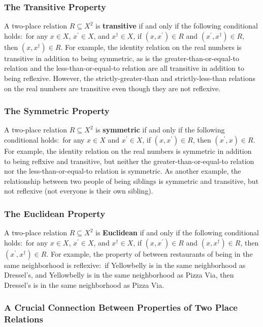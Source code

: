 \documentclass[11pt]{article}
\theoremstyle{definition}
\theoremstyle{remark}
\begin{document}
\subsubsection{The Transitive Property}
A two-place relation $R\subseteq X^{2}$ is \textbf{transitive} if and only if the following conditional holds:\ for any $x\in X$, $x^{\prime}\in X$, and $x^{\dagger}\in X$, if $(x,x^{\prime})\in R$ and  $(x^{\prime},x^{\dagger})\in R$, then $(x,x^{\dagger})\in R$. For example, the identity relation on the real numbers is transitive in addition to being symmetric, as is the greater-than-or-equal-to relation and the less-than-or-equal-to relation are all transitive in addition to being reflexive. However, the strictly-greater-than and strictly-less-than relations on the real numbers are transitive even though they are not reflexive.

\subsubsection{The Symmetric Property}
A two-place relation $R\subseteq X^{2}$ is \textbf{symmetric} if and only if the following conditional holds:\ for any $x\in X$ and $x^{\prime}\in X$, if $(x,x^{\prime})\in R$, then $(x^{\prime},x)\in R$. For example, the identity relation on the real numbers is symmetric in addition to being reflxive and transitive, but neither the greater-than-or-equal-to relation nor the less-than-or-equal-to relation is symmetric. As another example, the relationship between two people of being siblings is symmetric and transitive, but not reflexive (not everyone is their own sibling).


\subsubsection{The Euclidean Property}
A two-place relation $R\subseteq X^{2}$ is \textbf{Euclidean} if and only if the following conditional holds:\ for any $x\in X$, $x^{\prime}\in X$, and $x^{\dagger}\in X$, if $(x,x^{\prime})\in R$ and  $(x,x^{\dagger})\in R$, then $(x^{\prime},x^{\dagger})\in R$. For example, the property of between restaurants of being in the same neighborhood is reflexive:\ if Yellowbelly is in the same neighborhood as Dressel's, and Yellowbelly is in the same neighborhood as Pizza Via, then Dressel's is in the same neighborhood as Pizza Via.\par 


\subsubsection{A Crucial Connection Between Properties of Two Place Relations}
\end{document}
